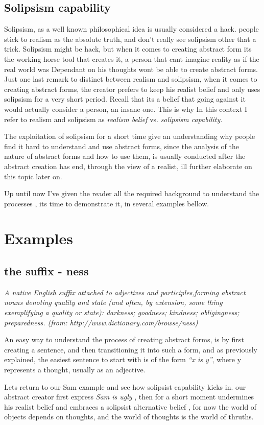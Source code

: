 \documentclass[10pt]{article}
\begin{document}
\subsection*{Solipsism capability}
Solipsism, as a well known philosophical idea is usually considered a hack. people  stick to realism as the absolute truth, and don't really see solipsism other that a  trick. Solipsism might be hack, but when it comes to creating abstract form its the working horse tool that creates it, a person that cant imagine reality as if the real world was Dependant on his thoughts wont be able to create abstract forms.
Just one last remark to distinct between realism and solipsism, when it comes to creating abstract forms, the creator prefers to keep his realist belief and only uses solipsism for a very short period. Recall that its a belief that going against it would actually consider a person, an insane one. This is why In this context I refer to realism and solipsism as \textit{realism belief} vs. \textit{solipsism capability}.\par
The exploitation of solipsism for a short time give an understanding why people find it hard to understand and use abstract forms, since the analysis of the nature of abstract forms and how to use them, is usually conducted after the abstract creation has end, through the view of a realist, ill further elaborate on this topic later on.\par
Up until now I've given the reader all the required background to understand the processes , its time to demonstrate it, in several examples bellow.\par

\newpage 
\section*{Examples}
\subsection*{the suffix - ness}
\textit{A native English suffix attached to adjectives and participles,forming abstract nouns denoting quality and state (and often, by extension, some thing exemplifying a quality or state):
darkness; goodness; kindness; obligingness; preparedness.
(from: http://www.dictionary.com/browse/ness)}
\par
An easy way to understand the process of creating abstract forms, is by first creating a sentence, and then transitioning it into such a form, and as previously explained, the easiest sentence to start with is of the form \textit{“x is y”}, where y represents a thought, usually as an adjective.\par
Lets return to our Sam example and see how solipsist capability kicks in. our abstract creator first express \textit{Sam is ugly} , then for a short moment undermines his realist belief and embraces a solipsist alternative belief , for now the world of objects depends on thoughts, and the world of thoughts is the world of thruths.\par
\end{document}
